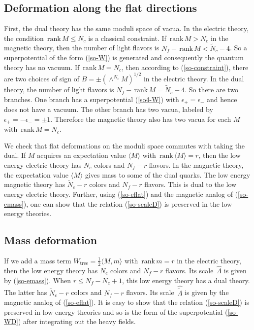 \documentclass[lecture]{qft-l}
\newcommand{\eps}{\epsilon}
\newcommand{\Lam}{\varLambda}
\newcommand{\bra}{\langle}
\newcommand{\ket}{\rangle}
\newcommand{\inv}[1]{\frac{1}{#1}}
\newcommand{\hf}{{\textstyle \inv{2}}}
\newcommand{\rank}{\mathrm{\,rank\,}}
\newcommand{\tree}{_\mathrm{tree}}
\newcommand{\hLam}{\,\hat{\!\Lam}{}}
\newcommand{\htLam}{\,\hat{\tilde{\!\Lam}}{}}
\newcommand{\tN}{\tilde{N}_c}
\def\Subhead#1{\subsection*{#1}}
\begin{document}
\Subhead{Deformation along the flat directions}

First, the dual theory has the same moduli space of vacua.
In the electric theory, the condition $\rank M\le N_c$ is a classical 
constraint.
If $\rank M>N_c$ in the magnetic theory, then the number of light flavors is
$N_f-\rank M<\tN-4$.
So a superpotential of the form (\ref{so-W}) is generated and consequently
the quantum theory has no vacuum.
If $\rank M=N_c$, then according to (\ref{so-constraint}), there are two 
choices of sign of $B=\pm(\wedge^{N_c}M)^{1/2}$ in the electric theory.
In the dual theory, the number of light flavors is $N_f-\rank M=\tN-4$.
So there are two branches.
One branch has a superpotential (\ref{so4-W}) with $\eps_+=\eps_-$
and hence does not have a vacuum.
The other branch has two vacua, labeled by $\eps_+=-\eps_-=\pm1$.
Therefore the magnetic theory also has two vacua for each $M$ with 
$\rank M=N_c$.

We check that flat deformations on the moduli space commutes with taking the
dual.
If $M$ acquires an expectation value $\bra M\ket$ with $\rank \bra M\ket=r$,
then the low energy electric theory has $N_c$ colors and $N_f-r$ flavors.
In the magnetic theory, the expectation value $\bra M\ket$ gives mass to some
of the dual quarks.
The low energy magnetic theory has $\tN-r$ colors and $N_f-r$ flavors.
This is dual to the low energy electric theory.
Further, using (\ref{so-eflat}) and the magnetic analog of (\ref{so-emass}),
one can show that the relation (\ref{so-scaleD}) is preserved in the
low energy theories.


\Subhead{Mass deformation}

If we add a mass term $W\tree=\hf\bra M,m\ket$ with $\rank m=r$ in the
electric theory, then the low energy theory has $N_c$ colors and $N_f-r$
flavors.
Its scale $\hLam$ is given by (\ref{so-emass}).
When $r\le N_f-N_c+1$, this low energy theory has a dual theory.
The latter has $\tN-r$ colors and $N_f-r$ flavors.
Its scale $\htLam$ is given by the magnetic analog of (\ref{so-eflat}).
It is easy to show that the relation (\ref{so-scaleD}) is preserved in
low energy theories and so is the form of the superpotential (\ref{so-WD})
after integrating out the heavy fields.
\end{document}
